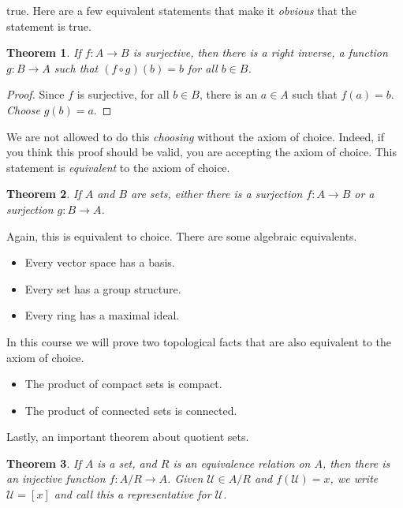\documentclass{article}
\theoremstyle{plain}
\newtheorem{theorem}{Theorem}[section]
\theoremstyle{normal}
\begin{document}
        true. Here are a few equivalent statements that make it
        \textit{obvious} that the statement is true.
        \begin{theorem}
            If $f:A\rightarrow{B}$ is surjective, then there is a
            right inverse, a function $g:B\rightarrow{A}$ such that
            $(f\circ{g})(b)=b$ for all $b\in{B}$.
        \end{theorem}
        \begin{proof}
            Since $f$ is surjective, for all $b\in{B}$, there is an
            $a\in{A}$ such that $f(a)=b$. \textit{Choose} $g(b)=a$.
        \end{proof}
        We are not allowed to do this \textit{choosing} without the axiom of
        choice. Indeed, if you think this proof should be valid, you are
        accepting the axiom of choice. This statement is
        \textit{equivalent} to the axiom of choice.
        \begin{theorem}
            If $A$ and $B$ are sets, either there is a surjection
            $f:A\rightarrow{B}$ or a surjection $g:B\rightarrow{A}$.
        \end{theorem}
        Again, this is equivalent to choice. There are some algebraic
        equivalents.
        \begin{itemize}
            \item Every vector space has a basis.
            \item Every set has a group structure.
            \item Every ring has a maximal ideal.
        \end{itemize}
        In this course we will prove two topological facts that are also
        equivalent to the axiom of choice.
        \begin{itemize}
            \item The product of compact sets is compact.
            \item The product of connected sets is connected.
        \end{itemize}
        Lastly, an important theorem about quotient sets.
        \begin{theorem}
            If $A$ is a set, and $R$ is an equivalence relation on $A$, then
            there is an injective function $f:A/R\rightarrow{A}$. Given
            $\mathcal{U}\in{A}/R$ and $f(\mathcal{U})=x$, we write
            $\mathcal{U}=[x]$ and call this a \textit{representative} for
            $\mathcal{U}$.
        \end{theorem}
\end{document}

